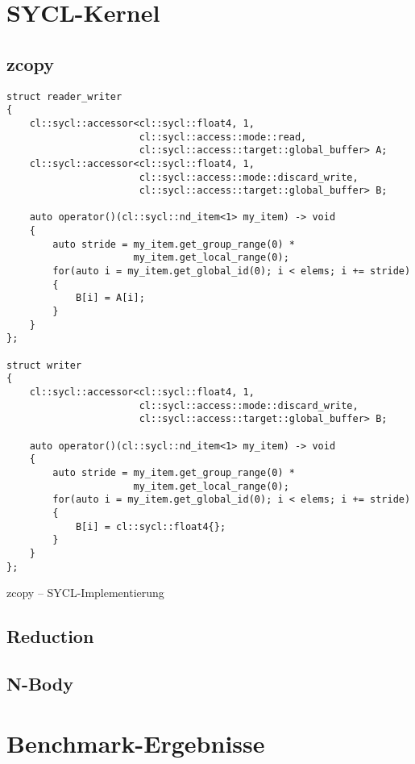 \section{SYCL-Kernel}

\subsection{zcopy}

\begin{code}
    \begin{verbatim}
struct reader_writer
{
    cl::sycl::accessor<cl::sycl::float4, 1,
                       cl::sycl::access::mode::read,
                       cl::sycl::access::target::global_buffer> A;
    cl::sycl::accessor<cl::sycl::float4, 1,
                       cl::sycl::access::mode::discard_write,
                       cl::sycl::access::target::global_buffer> B;

    auto operator()(cl::sycl::nd_item<1> my_item) -> void
    {
        auto stride = my_item.get_group_range(0) *
                      my_item.get_local_range(0);
        for(auto i = my_item.get_global_id(0); i < elems; i += stride)
        {
            B[i] = A[i];
        }
    }
};

struct writer
{
    cl::sycl::accessor<cl::sycl::float4, 1,
                       cl::sycl::access::mode::discard_write,
                       cl::sycl::access::target::global_buffer> B;

    auto operator()(cl::sycl::nd_item<1> my_item) -> void
    {
        auto stride = my_item.get_group_range(0) *
                      my_item.get_local_range(0);
        for(auto i = my_item.get_global_id(0); i < elems; i += stride)
        {
            B[i] = cl::sycl::float4{};
        }
    }
};
    \end{verbatim}
    \caption{zcopy -- SYCL-Implementierung}
    \label{anhang:sycl:zcopy}
\end{code}

\subsection{Reduction}
\subsection{N-Body}

\section{Benchmark-Ergebnisse}

